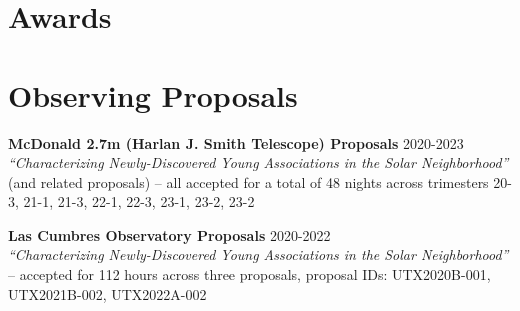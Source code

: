 \documentclass[12pt,a4paper,sans,xetex]{moderncv}        %
\begin{document}
\vspace{-1em}

\section{Awards}





\vspace{-1em}

\section{Observing Proposals}

\vspace{-0.5em}

\textbf{McDonald 2.7m (Harlan J. Smith Telescope) Proposals} \hfill 2020-2023 \\
\textit{``Characterizing Newly-Discovered Young Associations in
the Solar Neighborhood''} (and related proposals) -- all accepted for a total of 48 nights across trimesters 20-3, 21-1, 21-3, 22-1, 22-3, 23-1, 23-2, 23-2

\vspace{3pt}

\textbf{Las Cumbres Observatory Proposals} \hfill 2020-2022 \\ \textit{``Characterizing Newly-Discovered Young Associations in the Solar Neighborhood''} --  accepted for 112 hours across three proposals, proposal IDs: UTX2020B-001, UTX2021B-002, UTX2022A-002

\vspace{3pt}
\end{document}
